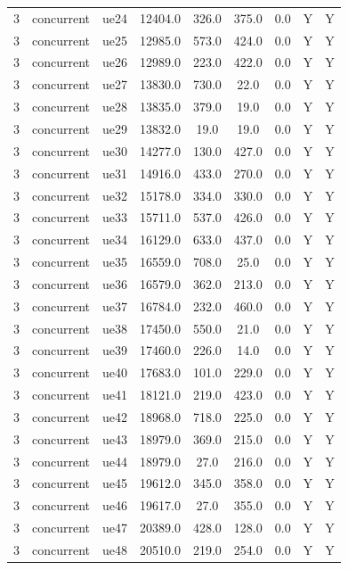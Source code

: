 \begin{table}[ht]
\begin{tabular}{|c|c|c|c|c|c|c|c|c|}
3 & concurrent & ue24 & 12404.0 & 326.0 & 375.0 & 0.0 & Y & Y \\
3 & concurrent & ue25 & 12985.0 & 573.0 & 424.0 & 0.0 & Y & Y \\
3 & concurrent & ue26 & 12989.0 & 223.0 & 422.0 & 0.0 & Y & Y \\
3 & concurrent & ue27 & 13830.0 & 730.0 & 22.0 & 0.0 & Y & Y \\
3 & concurrent & ue28 & 13835.0 & 379.0 & 19.0 & 0.0 & Y & Y \\
3 & concurrent & ue29 & 13832.0 & 19.0 & 19.0 & 0.0 & Y & Y \\
3 & concurrent & ue30 & 14277.0 & 130.0 & 427.0 & 0.0 & Y & Y \\
3 & concurrent & ue31 & 14916.0 & 433.0 & 270.0 & 0.0 & Y & Y \\
3 & concurrent & ue32 & 15178.0 & 334.0 & 330.0 & 0.0 & Y & Y \\
3 & concurrent & ue33 & 15711.0 & 537.0 & 426.0 & 0.0 & Y & Y \\
3 & concurrent & ue34 & 16129.0 & 633.0 & 437.0 & 0.0 & Y & Y \\
3 & concurrent & ue35 & 16559.0 & 708.0 & 25.0 & 0.0 & Y & Y \\
3 & concurrent & ue36 & 16579.0 & 362.0 & 213.0 & 0.0 & Y & Y \\
3 & concurrent & ue37 & 16784.0 & 232.0 & 460.0 & 0.0 & Y & Y \\
3 & concurrent & ue38 & 17450.0 & 550.0 & 21.0 & 0.0 & Y & Y \\
3 & concurrent & ue39 & 17460.0 & 226.0 & 14.0 & 0.0 & Y & Y \\
3 & concurrent & ue40 & 17683.0 & 101.0 & 229.0 & 0.0 & Y & Y \\
3 & concurrent & ue41 & 18121.0 & 219.0 & 423.0 & 0.0 & Y & Y \\
3 & concurrent & ue42 & 18968.0 & 718.0 & 225.0 & 0.0 & Y & Y \\
3 & concurrent & ue43 & 18979.0 & 369.0 & 215.0 & 0.0 & Y & Y \\
3 & concurrent & ue44 & 18979.0 & 27.0 & 216.0 & 0.0 & Y & Y \\
3 & concurrent & ue45 & 19612.0 & 345.0 & 358.0 & 0.0 & Y & Y \\
3 & concurrent & ue46 & 19617.0 & 27.0 & 355.0 & 0.0 & Y & Y \\
3 & concurrent & ue47 & 20389.0 & 428.0 & 128.0 & 0.0 & Y & Y \\
3 & concurrent & ue48 & 20510.0 & 219.0 & 254.0 & 0.0 & Y & Y \\

\end{tabular}
\end{table}
